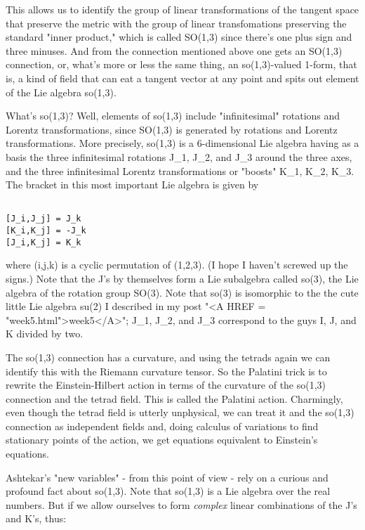 This allows us to identify the group of linear transformations of the
tangent space that preserve the metric with the group of linear
transfomations preserving the standard "inner product," which is called
SO(1,3) since there's one plus sign and three minuses.  And from the
connection mentioned above one gets an SO(1,3) connection, or, what's
more or less the same thing, an so(1,3)-valued 1-form, that is, a kind
of field that can eat a tangent vector at any point and spits out 
element of the Lie algebra so(1,3).  

What's so(1,3)?  Well, elements of so(1,3) include
"infinitesimal" rotations and Lorentz transformations, since
SO(1,3) is generated by rotations and Lorentz transformations.  More
precisely, so(1,3) is a 6-dimensional Lie algebra having as a basis the
three infinitesimal rotations J_1, J_2, and J_3 around the three axes,
and the three infinitesimal Lorentz transformations or "boosts" K_1,
K_2, K_3.  The bracket in this most important Lie algebra is given by


\begin{verbatim}

[J_i,J_j] = J_k
[K_i,K_j] = -J_k
[J_i,K_j] = K_k
\end{verbatim}
    

where (i,j,k) is a cyclic permutation of (1,2,3).  (I hope I haven't
screwed up the signs.)  Note that the J's by themselves form a Lie
subalgebra called so(3), the Lie algebra of the rotation group SO(3).
Note that so(3) is isomorphic to the the cute little Lie algebra su(2) I
described in my post "<A HREF = "week5.html">week5</A>"; J_1, J_2, and J_3 correspond to the guys
I, J, and K divided by two.  

The so(1,3) connection has a curvature, and using the tetrads again we
can identify this with the Riemann curvature tensor.  So the Palatini
trick is to rewrite the Einstein-Hilbert action in terms of the
curvature of the so(1,3) connection and the tetrad field.  This is
called the Palatini action.  Charmingly, even though the tetrad field is
utterly unphysical, we can treat it and the so(1,3) connection as
independent fields and, doing calculus of variations to find stationary
points of the action, we get equations equivalent to Einstein's
equations.

Ashtekar's "new variables" - from this point of view - rely on a curious
and profound fact about so(1,3).  Note that so(1,3) is a Lie algebra
over the real numbers.  But if we allow ourselves to form \emph{complex}
linear combinations of the J's and K's, thus:


